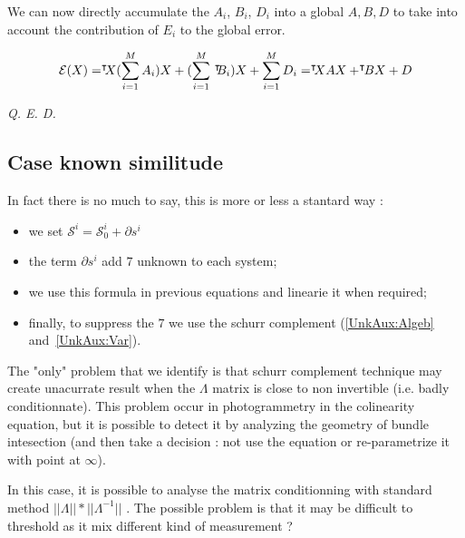 We can now directly accumulate the $A_i$, $B_i$, $D_i$ into a global $A,B,D$ 
to take into account the contribution of $E_i$ to the global error.

\begin{equation}
    \mathcal{E}(X) =      \Transss {X}    (\sum\limits_{\substack{i=1 }}^{M} A_i) X  
                     +   (\sum\limits_{\substack{i=1 }}^{M} \, \Transs {B_i})   X   
                     +  \sum\limits_{\substack{i=1 }}^{M}  D_i
                   = \Transss {X} A X  +  \Transs {B}   X + D
\end{equation}

\begin{center}
    \emph {Q. E. D.}
\end{center}


\subsection{Case known similitude}

In fact there is no much to say, this is more or less a stantard way :

\begin{itemize}
   \item we set $\mathcal{S}^i = \mathcal{S}^i_0 + \partial s^i $
   \item the term $\partial s^i $ add $7$ unknown to each system;
   \item we use this formula in previous equations and linearie it when required;
   \item finally, to suppress the $7$ we use the schurr complement (\ref{UnkAux:Algeb} and~\ref{UnkAux:Var}).
\end{itemize}

The "only" problem that we identify is that schurr complement technique may 
create unacurrate result when the $\Lambda$ matrix is close to non invertible 
(i.e. badly conditionnate).  This problem occur in photogrammetry in the
colinearity equation, but it is possible to detect it by analyzing the geometry
of bundle intesection (and then take a decision : not use the equation or 
re-parametrize it with point at $\infty$).

In this case, it is possible to analyse the matrix conditionning with
standard method $||\Lambda|| * ||\Lambda ^{-1}||$ . The possible problem
is that it may be difficult to threshold as it mix different kind of measurement ?


